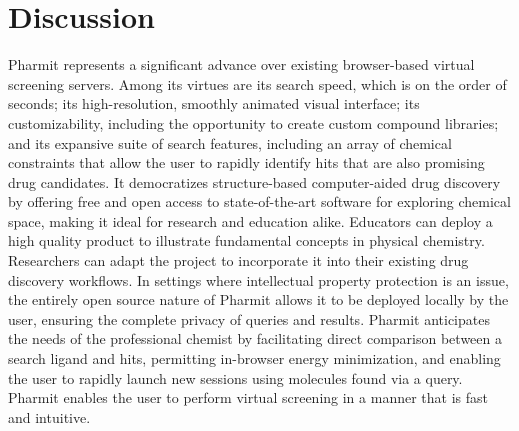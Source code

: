 \section{Discussion}
Pharmit represents a significant advance over existing browser-based virtual screening servers. Among its virtues are its search speed, which is on the order of seconds; its high-resolution, smoothly animated visual interface; its customizability, including the opportunity to create custom compound libraries; and its expansive suite of search features, including an array of chemical constraints that allow the user to rapidly identify hits that are also promising drug candidates. It democratizes structure-based computer-aided drug discovery by offering free and open access to state-of-the-art software for exploring chemical space, making it ideal for research and education alike. Educators can deploy a high quality product to illustrate fundamental concepts in physical chemistry. Researchers can adapt the project to incorporate it into their existing drug discovery workflows. In settings where intellectual property protection is an issue, the entirely open source nature of Pharmit allows it to be deployed locally by the user, ensuring the complete privacy of queries and results.  Pharmit anticipates the needs of the professional chemist by facilitating direct comparison between a search ligand and hits, permitting in-browser energy minimization, and enabling the user to rapidly launch new sessions using molecules found via a query. Pharmit enables the user to perform virtual screening in a manner that is fast and intuitive. 


